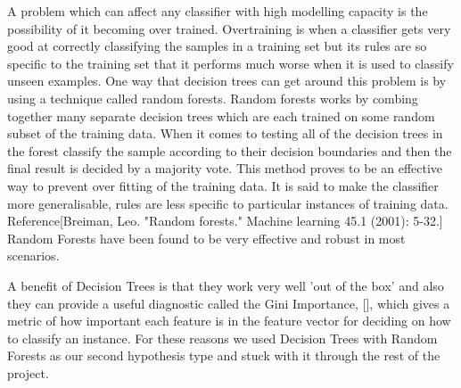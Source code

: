 \documentclass[12pt]{IIBproject}
\begin{document}
A problem which can affect any classifier with high modelling capacity is the possibility of it becoming over trained. Overtraining is when a classifier gets very good at correctly classifying the samples in a training set but its rules are so specific to the training set that it performs much worse when it is used to classify unseen examples. One way that decision trees can get around this problem is by using a technique called random forests. Random forests works by combing together many separate decision trees which are each trained on some random subset of the training data. When it comes to testing all of the decision trees in the forest classify the sample according to their decision boundaries and then the final result is decided by a majority vote. This method proves to be an effective way to prevent over fitting of the training data. It is said to make the classifier more generalisable, rules are less specific to particular instances of training data. Reference[Breiman, Leo. "Random forests." Machine learning 45.1 (2001): 5-32.] Random Forests have been found to be very effective and robust in most scenarios. 

A benefit of Decision Trees is that they work very well 'out of the box' and also they can provide a useful diagnostic called the Gini Importance, [], which gives a metric of how important each feature is in the feature vector for deciding on how to classify an instance. For these reasons we used Decision Trees with Random Forests as our second hypothesis type and stuck with it through the rest of the project.
\end{document}
